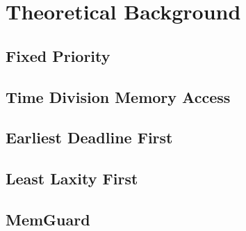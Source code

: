 \section{Theoretical Background}
    \subsection{Fixed Priority}
    \subsection{Time Division Memory Access}
    \subsection{Earliest Deadline First}
    \subsection{Least Laxity First}
    \subsection{MemGuard}